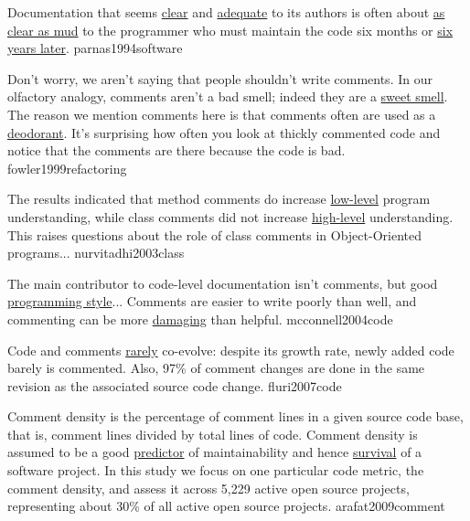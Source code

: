 \documentclass{article}
\begin{document}
  {Documentation that seems \ul{clear} and \ul{adequate} to its authors is often about \ul{as clear as mud} to the programmer who must maintain the code six months or \ul{six years later}.}
  {parnas1994software}


  {Don't worry, we aren't saying that people shouldn't write comments. In our olfactory analogy, comments aren't a bad smell; indeed they are a \ul{sweet smell}. The reason we mention comments here is that comments often are used as a \ul{deodorant}. It's surprising how often you look at thickly commented code and notice that the comments are there because the code is bad.}
  {fowler1999refactoring}

  {The results indicated that method comments do increase \ul{low-level} program understanding, while class comments did not increase \ul{high-level} understanding. This raises questions about the role of class comments in Object-Oriented programs...}
  {nurvitadhi2003class}

  {The main contributor to code-level documentation isn't comments, but good \ul{programming style}... Comments are easier to write poorly than well, and commenting can be more \ul{damaging} than helpful.}
  {mcconnell2004code}

  {Code and comments \ul{rarely} co-evolve: despite its growth rate, newly added code barely is commented. Also, 97\% of comment changes are done in the same revision as the associated source code change.}
  {fluri2007code}

  {Comment density is the percentage of comment lines in a given source code base, that is, comment lines divided by total lines of code. Comment density is assumed to be a good \ul{predictor} of maintainability and hence \ul{survival} of a software project. In this study we focus on one particular code metric, the comment density, and assess it across 5,229 active open source projects, representing about 30\% of all active open source projects.}
  {arafat2009comment}
\end{document}
